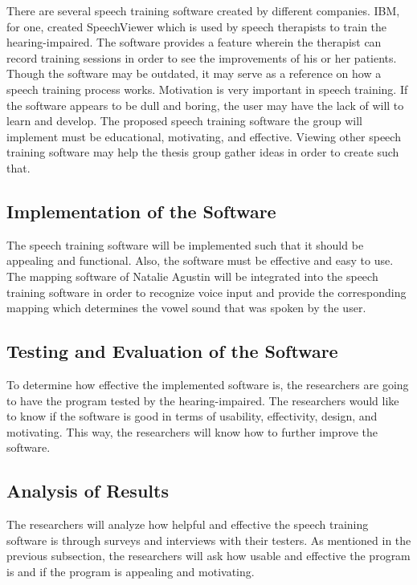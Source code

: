 There are several speech training software created by different companies. IBM, for one, created SpeechViewer which is used by speech  therapists to train the hearing-impaired. The software provides a feature wherein the therapist can record training sessions in order to see the improvements of his or her patients. Though the software may be outdated, it may serve as a reference on how a speech training process works. Motivation is very important in speech training. If the software appears to be dull and boring, the user may have the lack of will to learn and develop. The proposed speech training software the group will implement must be educational, motivating, and effective. Viewing other speech training software may help the thesis group gather ideas in order to create such that.

\subsection{Implementation of the Software}
The speech training software will be implemented such that it should be appealing and functional. Also, the software must be effective and easy to use. The mapping software of Natalie Agustin \citeyear{agustin:2014:SOM} will be integrated into the speech training software in order to recognize voice input and provide the corresponding mapping which determines the vowel sound that was spoken by the user.

\subsection{Testing and Evaluation of the Software}
To determine how effective the implemented software is, the researchers are going to have the program tested by the hearing-impaired. The researchers would like to know if the software is good in terms of usability, effectivity, design, and motivating. This way, the researchers will know how to further improve the software.

\subsection{Analysis of Results}
The researchers will analyze how helpful and effective the speech training software is through surveys and interviews with their testers. As mentioned in the previous subsection, the researchers will ask how usable and effective the program is and if the program is appealing and motivating.


